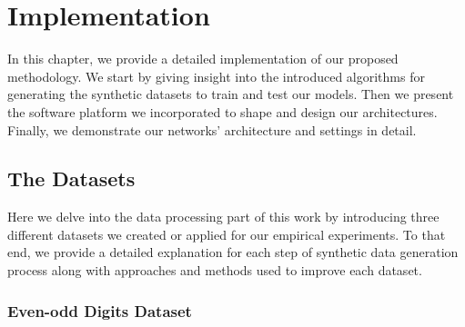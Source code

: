 
\chapter{Implementation}
\label{sec:implementation}
\noindent
In this chapter, we provide a detailed implementation of our proposed methodology. We start by giving insight into the introduced algorithms for generating the synthetic datasets to train and test our models. Then we present the software platform we incorporated to shape and design our architectures. Finally, we demonstrate our networks' architecture and settings in detail. 




\section{The Datasets}
\label{dataha}

Here we delve into the data processing part of this work by introducing three different datasets we created or applied for our empirical experiments. To that end, we provide a detailed explanation for each step of synthetic data generation process along with approaches and methods used to improve each dataset.


\subsection{Even-odd Digits Dataset}
\label{subsubsec:digit}

